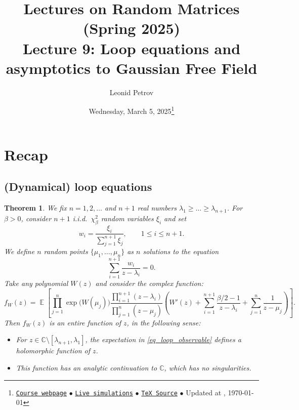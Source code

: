\documentclass[letterpaper,11pt,oneside,reqno]{article}
\numberwithin{equation}{section}
\newtheorem{theorem}[proposition]{Theorem}
\theoremstyle{definition}
\begin{document}
\title{Lectures on Random Matrices
(Spring 2025)
\\Lecture 9: Loop equations and asymptotics to Gaussian Free Field}


\date{Wednesday, March 5, 2025\footnote{\href{https://lpetrov.cc/rmt25/}{\texttt{Course webpage}}
$\bullet$ \href{https://lpetrov.cc/simulations/model/random-matrices/}{\texttt{Live simulations}}
$\bullet$ \href{https://lpetrov.cc/rmt25/rmt25-notes/rmt2025-l09.tex}{\texttt{TeX Source}}
$\bullet$
Updated at \currenttime, \today}}


\author{Leonid Petrov}

\maketitle

\section{Recap}

\subsection{(Dynamical) loop equations}

\begin{theorem}
	\label{Theorem_loop_equation}
 We fix $n=1,2,\dots$ and $n+1$ real numbers $\lambda_1\ge\dots\ge\lambda_{n+1}$. For $\beta>0$, consider $n+1$ i.i.d.\ $\chi^2_\beta$ random variables $\xi_i$ and set
 $$
  w_i=\frac{\xi_i}{\sum_{j=1}^{n+1} \xi_j}, \qquad 1\le i \le n+1.
 $$
 We define $n$ random points $\{\mu_1,\dots,\mu_n\}$ as $n$ solutions to the equation
 \begin{equation} \label{eq_mu_equation}
  \sum_{i=1}^{n+1} \frac{w_i}{z-\lambda_i}=0.
 \end{equation}
 Take any \emph{polynomial} $W(z)$ and consider the complex function:
 \begin{equation}
 \label{eq_loop_observable}
 f_W(z)=\operatorname{\mathbb{E}}\left[\prod_{j=1}^n \exp\bigl(W(\mu_j)\bigr) \frac{\prod_{i=1}^{n+1} (z-\lambda_i)}{\prod_{j=1}^n (z-\mu_j)} \left( W'(z)+\sum_{i=1}^{n+1} \frac{\beta/2-1}{z-\lambda_i} + \sum_{j=1}^n \frac{1}{z-\mu_j}\right)\right].
 \end{equation}
 Then $f_W(z)$ is an \emph{entire function} of $z$, in the following sense:
 \begin{itemize}
	 \item For $z\in \mathbb{C}\setminus [\lambda_{n+1},\lambda_1]$, the expectation in \eqref{eq_loop_observable} defines a holomorphic function of $z$.
  \item This function has an analytic continuation to $\mathbb{C}$, which has no singularities.
 \end{itemize}
\end{theorem}
\end{document}
